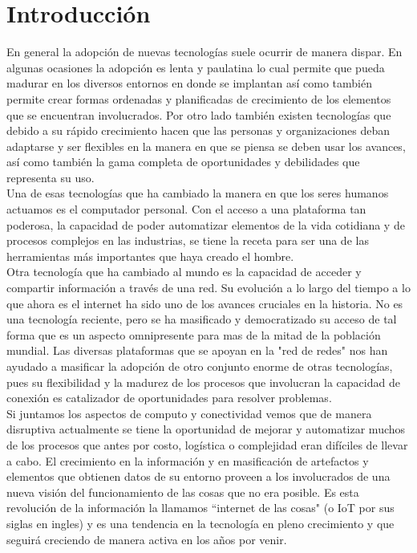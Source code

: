 

\chapter{Introducción}
En general la adopción de nuevas tecnologías suele ocurrir de manera dispar. En algunas ocasiones la adopción es lenta y paulatina lo cual permite que pueda madurar en los diversos entornos en donde se implantan así como también permite crear formas ordenadas y planificadas de crecimiento de los elementos que se encuentran involucrados. Por otro lado también existen tecnologías que debido a su rápido crecimiento hacen que las personas y organizaciones deban adaptarse y ser flexibles en la manera en que se piensa se deben usar los avances, así como también la gama completa de oportunidades y debilidades que representa su uso.\\ 

Una de esas tecnologías que ha cambiado la manera en que los seres humanos actuamos es el computador personal. Con el acceso a una plataforma tan poderosa, la capacidad de poder automatizar elementos de la vida cotidiana y de procesos complejos en las industrias, se tiene la receta para ser una de las herramientas más importantes que haya creado el hombre. \\

Otra tecnología que ha cambiado al mundo es la capacidad de acceder y compartir información a través de una red. Su evolución a lo largo del tiempo a lo que ahora es el internet ha sido uno de los avances cruciales en la historia. No es una tecnología reciente, pero se ha masificado y democratizado su acceso de tal forma que es un aspecto omnipresente para mas de la mitad de la población mundial. Las diversas plataformas que se apoyan en la "red de redes" nos han ayudado a masificar la adopción de otro conjunto enorme de otras tecnologías, pues su flexibilidad y la madurez de los procesos que involucran la capacidad de conexión es catalizador de oportunidades para resolver problemas.\\

Si juntamos los aspectos de computo y conectividad vemos que de manera disruptiva actualmente se tiene la oportunidad de mejorar y automatizar muchos de los procesos que antes por costo, logística o complejidad eran difíciles de llevar a cabo. El crecimiento en la información y en masificación de artefactos y elementos que obtienen datos de su entorno proveen a los involucrados de una nueva visión del funcionamiento de las cosas que no era posible. Es esta revolución de la información la llamamos ``internet de las cosas" (o IoT por sus siglas en ingles) y es una tendencia en la tecnología en pleno crecimiento y que seguirá creciendo de manera activa en los años por venir.\\ 

